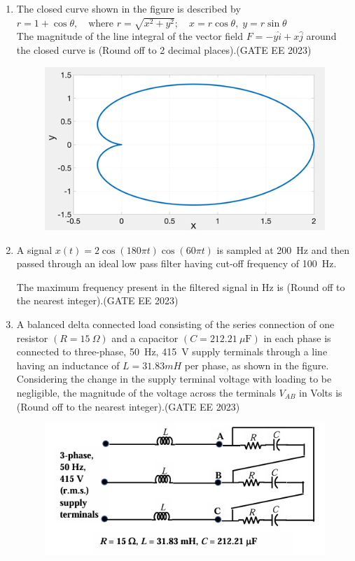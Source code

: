 \documentclass[a4paper,12pt]{exam}
\theoremstyle{remark}
\begin{document}
\begin{enumerate}
\item The closed curve shown in the figure is described by
$
r = 1 + \cos\theta, \quad \text{where } r = \sqrt{x^2 + y^2}; \quad x = r \cos\theta, \; y = r \sin\theta
$\\
The magnitude of the line integral of the vector field $F = -y\hat{i} + x\hat{j}$ around the closed curve is \underline{\hspace{2cm}} (Round off to 2 decimal places).\hfill{(GATE EE 2023)}
\begin{figure}[H]
    \centering
    \includegraphics[width=0.5\columnwidth]{figs/Q 62.png}
    \caption{}
    \label{fig:placeholder}
\end{figure}
\item A signal $x(t) = 2\cos(180\pi t)\cos(60\pi t)$ is sampled at 200~Hz and then passed through an ideal low pass filter having cut-off frequency of 100~Hz.

The maximum frequency present in the filtered signal in Hz is \underline{\hspace{2.5cm}} (Round off to the nearest integer).\hfill{(GATE EE 2023)}

\item A balanced delta connected load consisting of the series connection of one resistor $(R = 15~\Omega)$ and a capacitor $(C = 212.21~\mu\text{F})$ in each phase is connected to three-phase, 50~Hz, 415~V supply terminals through a line having an inductance of $L = 31.83mH$ per phase, as shown in the figure. Considering the change in the supply terminal voltage with loading to be negligible, the magnitude of the voltage across the terminals $V_{AB}$ in Volts is \underline{\hspace{2.5cm}} (Round off to the nearest integer).\hfill{(GATE EE 2023)}
\begin{figure}[H]
    \centering
    \includegraphics[width=0.8\columnwidth]{figs/Q 64.png}
    \caption{}
    \label{fig:placeholder}
\end{figure}



\end{enumerate}
\end{document}
